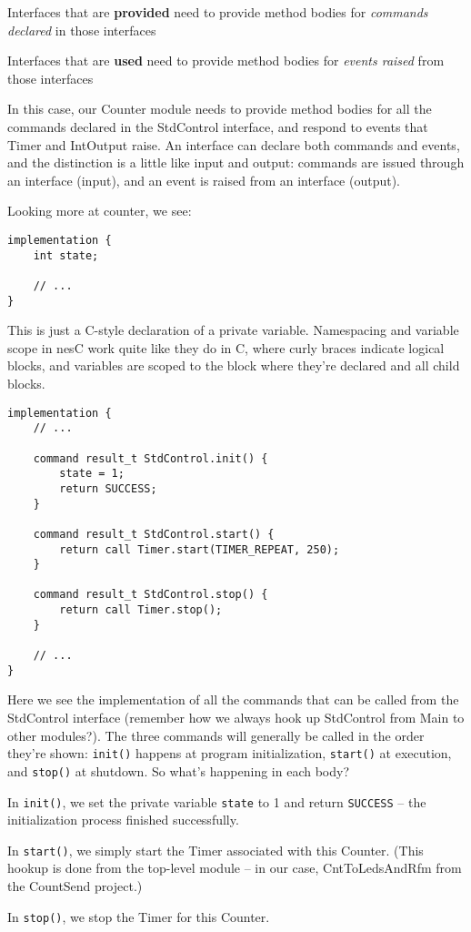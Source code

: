 \documentclass{article}
\begin{document}
\begin{itemize*}
\item Interfaces that are \textbf{provided} need to provide method bodies for \textit{commands declared} in those interfaces
\item Interfaces that are \textbf{used} need to provide method bodies for \textit{events raised} from those interfaces
\end{itemize*}

In this case, our Counter module needs to provide method bodies for all the commands declared in the StdControl interface, and respond to events that Timer and IntOutput raise. An interface can declare both commands and events, and the distinction is a little like input and output: commands are issued through an interface (input), and an event is raised from an interface (output).

Looking more at counter, we see:

\begin{verbatim}
implementation {
    int state;

    // ...
}
\end{verbatim}


This is just a C-style declaration of a private variable. Namespacing and variable scope in nesC work quite like they do in C, where curly braces indicate logical blocks, and variables are scoped to the block where they're declared and all child blocks.

\begin{verbatim}
implementation {
    // ...

    command result_t StdControl.init() {
        state = 1;
        return SUCCESS;
    }

    command result_t StdControl.start() {
        return call Timer.start(TIMER_REPEAT, 250);
    }

    command result_t StdControl.stop() {
        return call Timer.stop();
    }

    // ...
}
\end{verbatim}

Here we see the implementation of all the commands that can be called from the StdControl interface (remember how we always hook up StdControl from Main to other modules?). The three commands will generally be called in the order they're shown: \verb!init()! happens at program initialization, \verb!start()! at execution, and \verb!stop()! at shutdown. So what's happening in each body?

\begin{itemize*}
\item In \verb!init()!, we set the private variable \verb!state! to 1 and return \verb!SUCCESS! -- the initialization process finished successfully.
\item In \verb!start()!, we simply start the Timer associated with this Counter. (This hookup is done from the top-level module -- in our case, CntToLedsAndRfm from the CountSend project.)
\item In \verb!stop()!, we stop the Timer for this Counter.
\end{itemize*}
\end{document}
